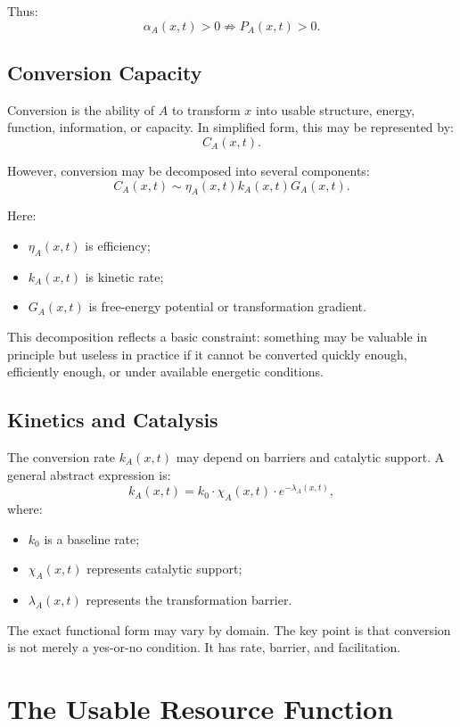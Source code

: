\documentclass[11pt,a4paper]{article}
\begin{document}
Thus:
\[
\alpha_A(x,t)>0 \nRightarrow P_A(x,t)>0.
\]

\subsection{Conversion Capacity}

Conversion is the ability of $A$ to transform $x$ into usable structure, energy, function, information, or capacity. In simplified form, this may be represented by:
\[
C_A(x,t).
\]

However, conversion may be decomposed into several components:
\[
C_A(x,t)\sim \eta_A(x,t)k_A(x,t)G_A(x,t).
\]

Here:
\begin{itemize}[leftmargin=2em]
\item $\eta_A(x,t)$ is efficiency;
\item $k_A(x,t)$ is kinetic rate;
\item $G_A(x,t)$ is free-energy potential or transformation gradient.
\end{itemize}

This decomposition reflects a basic constraint: something may be valuable in principle but useless in practice if it cannot be converted quickly enough, efficiently enough, or under available energetic conditions.

\subsection{Kinetics and Catalysis}

The conversion rate $k_A(x,t)$ may depend on barriers and catalytic support. A general abstract expression is:
\[
k_A(x,t)=k_0\cdot\chi_A(x,t)\cdot e^{-\lambda_A(x,t)},
\]
where:
\begin{itemize}[leftmargin=2em]
\item $k_0$ is a baseline rate;
\item $\chi_A(x,t)$ represents catalytic support;
\item $\lambda_A(x,t)$ represents the transformation barrier.
\end{itemize}

The exact functional form may vary by domain. The key point is that conversion is not merely a yes-or-no condition. It has rate, barrier, and facilitation.

\section{The Usable Resource Function}
\end{document}

